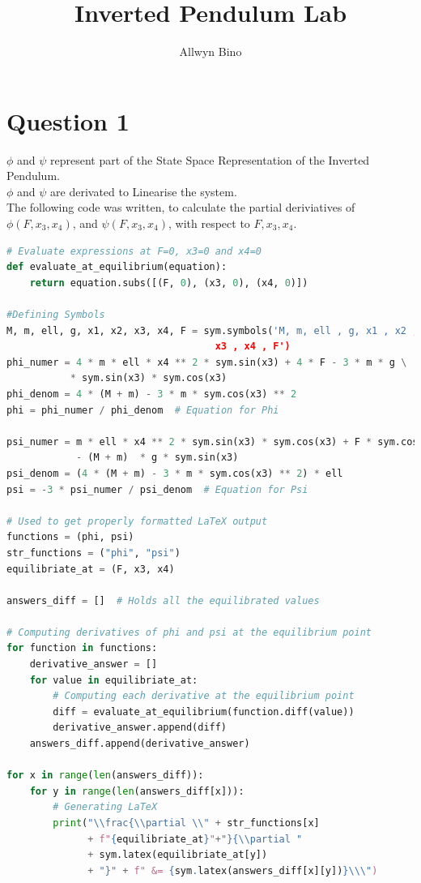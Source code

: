 \documentclass[a4paper,10pt,reqno]{article}
\title{Inverted Pendulum Lab}
\author{Allwyn Bino}
\date{}
\numberwithin{equation}{section}
\begin{document}
\maketitle

\section{Question 1}

\noindent
$\phi$ and $\psi$ represent part of the State Space Representation of the Inverted Pendulum.\\
$\phi$ and $\psi$ are derivated to Linearise the system.\\
The following code was written, to calculate the partial deriviatives of $\phi(F, x_{3}, x_{4})$, and $\psi(F, x_3, x_4)$,
with respect to $F, x_3, x_4$.\\

\begin{lstlisting}[language=Python]
# Evaluate expressions at F=0, x3=0 and x4=0
def evaluate_at_equilibrium(equation):
    return equation.subs([(F, 0), (x3, 0), (x4, 0)])

#Defining Symbols
M, m, ell, g, x1, x2, x3, x4, F = sym.symbols('M, m, ell , g, x1 , x2 , 
									x3 , x4 , F')
phi_numer = 4 * m * ell * x4 ** 2 * sym.sin(x3) + 4 * F - 3 * m * g \
           * sym.sin(x3) * sym.cos(x3)
phi_denom = 4 * (M + m) - 3 * m * sym.cos(x3) ** 2
phi = phi_numer / phi_denom  # Equation for Phi

psi_numer = m * ell * x4 ** 2 * sym.sin(x3) * sym.cos(x3) + F * sym.cos(x3) \
            - (M + m)  * g * sym.sin(x3)
psi_denom = (4 * (M + m) - 3 * m * sym.cos(x3) ** 2) * ell
psi = -3 * psi_numer / psi_denom  # Equation for Psi

# Used to get properly formatted LaTeX output
functions = (phi, psi)
str_functions = ("phi", "psi")
equilibriate_at = (F, x3, x4)

answers_diff = []  # Holds all the equilibrated values

# Computing derivatives of phi and psi at the equilibrium point
for function in functions:
    derivative_answer = []
    for value in equilibriate_at:
        # Computing each derivative at the equilibrium point
        diff = evaluate_at_equilibrium(function.diff(value))
        derivative_answer.append(diff)
    answers_diff.append(derivative_answer)

for x in range(len(answers_diff)):
    for y in range(len(answers_diff[x])):
        # Generating LaTeX
        print("\\frac{\\partial \\" + str_functions[x]
              + f"{equilibriate_at}"+"}{\\partial " 
              + sym.latex(equilibriate_at[y])
              + "}" + f" &= {sym.latex(answers_diff[x][y])}\\\")
\end{lstlisting}
\end{document}
